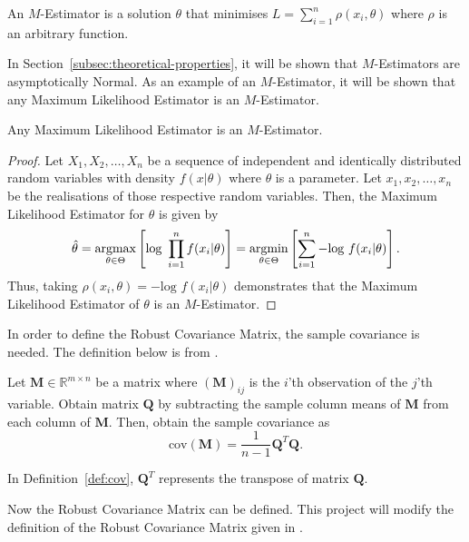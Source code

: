 \begin{definition}
    An $M$-Estimator is a solution $\theta$ that minimises $L = \sum_{i=1}^n \rho(x_i, \theta)$ where $\rho$ is an arbitrary function.
\end{definition}

In Section~\ref{subsec:theoretical-properties}, it will be shown that $M$-Estimators are asymptotically Normal. As an example of an $M$-Estimator, it will be shown that any Maximum Likelihood Estimator is an $M$-Estimator.

\begin{proposition}
    \label{prop:mle-is-m}
    Any Maximum Likelihood Estimator is an $M$-Estimator.
\end{proposition}

\begin{proof}
Let $X_1, X_2, \ldots, X_n$ be a sequence of independent and identically distributed random variables with density $f(x|\theta)$ where $\theta$ is a parameter. Let $x_1, x_2, \ldots, x_n$ be the realisations of those  respective random variables. Then, the Maximum Likelihood Estimator for $\theta$ is given by
\[ \hat{\theta} = \argmax_{\theta\in \Theta} \left[ \text{log }  \prod_{i=1}^n f(x_i|\theta) \right] = \argmin_{\theta\in \Theta} \left[ \sum_{i=1}^n -\text{log } f(x_i|\theta) \right].\]
Thus, taking $\rho(x_i, \theta) = -\text{log } f(x_i | \theta)$ demonstrates that the Maximum Likelihood Estimator of $\theta$ is an $M$-Estimator.
\end{proof}

In order to define the Robust Covariance Matrix, the sample covariance is needed. The definition below is from \cite{krzanowski_2000}. 

\begin{definition}
    \label{def:cov}
    Let $\pmb{M} \in \mathbb{R}^{m \times n}$ be a matrix where $(\pmb{M})_{ij}$ is the $i$'th observation of the $j$'th variable. Obtain matrix $\pmb{Q}$ by subtracting the sample column means of $\pmb{M}$ from each column of $\pmb{M}$. Then, obtain the sample covariance as
    \[ \text{cov}(\pmb{M}) = \frac{1}{n-1} \pmb{Q}^T \pmb{Q}. \]
\end{definition}

In Definition~\ref{def:cov}, $\pmb{Q}^T$ represents the transpose of matrix $\pmb{Q}$.

Now the Robust Covariance Matrix can be defined. This project will modify the definition of the Robust Covariance Matrix given in \cite{huber_1967}.

